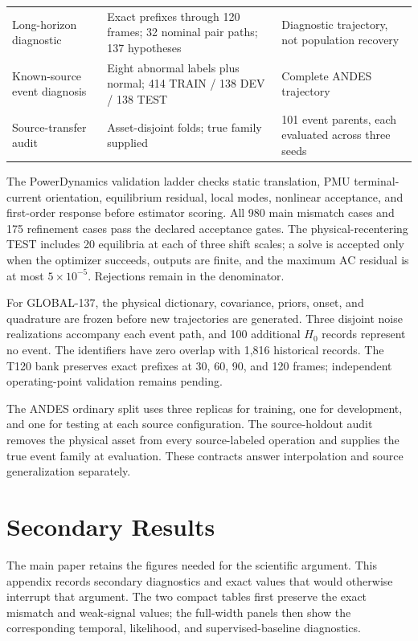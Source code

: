 \documentclass{ieeeaccess}
\begin{document}
\begin{table}[t]
\begin{tabularx}{\textwidth}{@{}lXX@{}}
Long-horizon diagnostic & Exact prefixes through 120 frames; 32 nominal pair paths; 137 hypotheses & Diagnostic trajectory, not population recovery \\
Known-source event diagnosis & Eight abnormal labels plus normal; 414 TRAIN / 138 DEV / 138 TEST & Complete ANDES trajectory \\
Source-transfer audit & Asset-disjoint folds; true family supplied & 101 event parents, each evaluated across three seeds \\
\bottomrule
\end{tabularx}
\end{table}

The PowerDynamics validation ladder checks static translation, PMU terminal-current orientation, equilibrium residual, local modes, nonlinear acceptance, and first-order response before estimator scoring. All 980 main mismatch cases and 175 refinement cases pass the declared acceptance gates. The physical-recentering TEST includes 20 equilibria at each of three shift scales; a solve is accepted only when the optimizer succeeds, outputs are finite, and the maximum AC residual is at most $5\times10^{-5}$. Rejections remain in the denominator.

For GLOBAL-137, the physical dictionary, covariance, priors, onset, and quadrature are frozen before new trajectories are generated. Three disjoint noise realizations accompany each event path, and 100 additional $H_0$ records represent no event. The identifiers have zero overlap with 1,816 historical records. The T120 bank preserves exact prefixes at 30, 60, 90, and 120 frames; independent operating-point validation remains pending.

The ANDES ordinary split uses three replicas for training, one for development, and one for testing at each source configuration. The source-holdout audit removes the physical asset from every source-labeled operation and supplies the true event family at evaluation. These contracts answer interpolation and source generalization separately.

\FloatBarrier
\section{Secondary Results}

The main paper retains the figures needed for the scientific argument. This appendix records secondary diagnostics and exact values that would otherwise interrupt that argument. The two compact tables first preserve the exact mismatch and weak-signal values; the full-width panels then show the corresponding temporal, likelihood, and supervised-baseline diagnostics.
\end{document}
